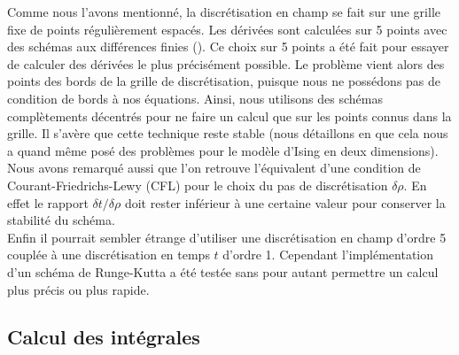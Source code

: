 \documentclass[10.5pt]{article}
\begin{document}
\begin{multicols*}{2}
Comme nous l'avons mentionné, la discrétisation en champ se fait sur une grille fixe de points régulièrement espacés. Les dérivées sont calculées sur 5 points avec des schémas aux différences finies (). Ce choix sur 5 points  a été fait pour essayer de calculer des dérivées le plus précisément possible. Le problème vient alors des points des bords de la grille de discrétisation, puisque nous ne possédons pas de condition de bords à nos équations. Ainsi, nous utilisons des schémas complètements décentrés pour ne faire un calcul que sur les points connus dans la grille. Il s'avère que cette technique reste stable (nous détaillons en  que cela nous a quand même posé des problèmes pour le modèle d'Ising en deux dimensions). \\

Nous avons remarqué aussi que l'on retrouve l'équivalent d'une condition de Courant-Friedrichs-Lewy (CFL) \cite{courant1967partial} pour le choix du pas de discrétisation $\delta \rho$. En effet le rapport $\delta t / \delta\rho$ doit rester inférieur à une certaine valeur pour conserver la stabilité du schéma.\\

Enfin il pourrait sembler étrange d'utiliser une discrétisation en champ d'ordre 5 couplée à une discrétisation en temps $t$ d'ordre 1. Cependant l'implémentation d'un schéma de Runge-Kutta a été testée sans pour autant permettre un calcul plus précis ou plus rapide. 




\subsection{Calcul des intégrales}


\end{multicols*}
\end{document}

